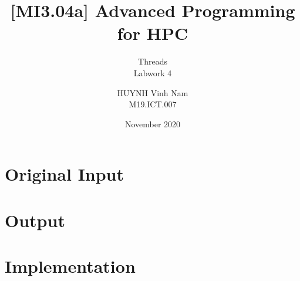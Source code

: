 \documentclass[10pt, a4paper]{article}
\title{[MI3.04a] Advanced Programming for HPC}
\subtitle{Threads \\ Labwork 4}
\author{HUYNH Vinh Nam \\ M19.ICT.007}
\date{November 2020}
\begin{document}
\maketitle


\section*{Original Input}
    \begin{center}
        \begin{figure}[H]
            \centering
            \label{fig:cuda-input}
        \end{figure}
    \end{center}
    
\section*{Output}
    \begin{center}
        \begin{figure}[H]
            \centering
            \label{fig:cuda-outputs}
        \end{figure}
    \end{center}

\hfill
\section*{Implementation}
\end{document}
